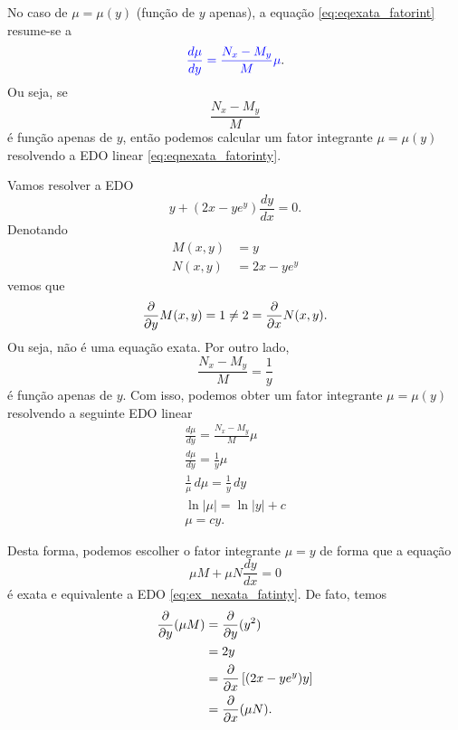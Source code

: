No caso de $\mu = \mu(y)$ (função de $y$ apenas), a equação \eqref{eq:eqexata_fatorint} resume-se a
\begin{equation}\label{eq:eqnexata_fatorinty}
  {\color{blue}\frac{d\mu}{dy} = \frac{N_x-M_y}{M}\mu}.
\end{equation}
Ou seja, se
\begin{equation}
  \frac{N_x-M_y}{M}
\end{equation}
é função apenas de $y$, então podemos calcular um fator integrante $\mu = \mu(y)$ resolvendo a EDO linear \eqref{eq:eqnexata_fatorinty}.

\begin{ex}
  Vamos resolver a EDO
  \begin{equation}\label{eq:ex_nexata_fatinty}
    y + (2x - ye^y)\frac{dy}{dx} = 0.
  \end{equation}
  Denotando
  \begin{align}
    M(x,y) &= y \\
    N(x,y) &= 2x - ye^y
  \end{align}
  vemos que
  \begin{equation}
    \frac{\partial}{\partial y}M(x,y) = 1 \neq 2 = \frac{\partial}{\partial x}N(x,y).
  \end{equation}
  Ou seja, não é uma equação exata. Por outro lado,
  \begin{equation}
    \frac{N_x-M_y}{M} = \frac{1}{y}
  \end{equation}
  é função apenas de $y$. Com isso, podemos obter um fator integrante $\mu = \mu(y)$ resolvendo a seguinte EDO linear
  \begin{gather}
    \frac{d\mu}{dy} = \frac{N_x-M_y}{M}\mu \\
    \frac{d\mu}{dy} = \frac{1}{y}\mu \\
    \frac{1}{\mu}\,d\mu = \frac{1}{y}\,dy \\
    \ln|\mu| = \ln|y| + c \\
    \mu = cy.
  \end{gather}

  Desta forma, podemos escolher o fator integrante $\mu = y$ de forma que a equação
  \begin{equation}\label{eq:ex_exata_fatinty}
    \mu M + \mu N\frac{dy}{dx} = 0
  \end{equation}
  é exata e equivalente a EDO \eqref{eq:ex_nexata_fatinty}. De fato, temos
  \begin{align}
    \frac{\partial}{\partial y}(\mu M) &= \frac{\partial}{\partial y}(y^2) \\
                           &= 2y \\
                           &= \frac{\partial}{\partial x}\left[(2x-ye^y)y\right] \\
                           &= \frac{\partial}{\partial x}(\mu N).
  \end{align}
  

\end{ex}

